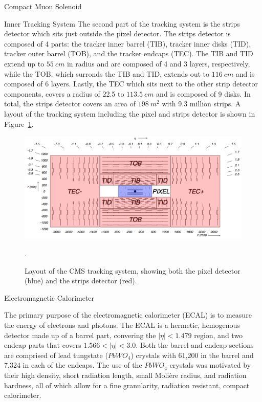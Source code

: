 \begin{section}{Compact Muon Solenoid}
\begin{subsection}{Inner Tracking System}
The second part of the tracking system is the strips detector which sits just outside the pixel detector.
The strips detector is composed of 4 parts: the tracker inner barrel (TIB), tracker inner disks (TID), tracker outer barrel (TOB), and the tracker endcaps (TEC).
The TIB and TID extend up to $55~cm$ in radius and are composed of 4 and 3 layers, respectively, while the TOB, which surronds the TIB and TID, extends out to $116~cm$ and is composed of 6 layers.
Lastly, the TEC which sits next to the other strip detector components, covers a radius of 22.5 to $113.5~cm$ and is composed of 9 disks.
In total, the strips detector covers an area of $198~m^{2}$ with 9.3 million strips.
A layout of the tracking system including the pixel and strips detector is shown in Figure~\ref{fig:cms_tracker}.

\begin{figure}[tbp!]
\begin{center}
\includegraphics[angle=0,width=0.80\columnwidth]{fig/cms_tracker.png}
\end{center}
\caption{Layout of the CMS tracking system, showing both the pixel detector (blue) and the strips detector (red).}.
\label{fig:cms_tracker}
\end{figure}

\end{subsection}

\begin{subsection}{Electromagnetic Calorimeter}

The primary purpose of the electromagnetic calorimeter (ECAL) is to measure the energy of electrons and photons.
The ECAL is a hermetic, hemogenous detector made up of a barrel part, convering the $|\eta|<1.479$ region, and two endcap parts that covers $1.566<|\eta|<3.0$.
Both the barrel and endcap sections are comprised of lead tungstate ($PbWO_{4}$) crystals with 61,200 in the barrel and 7,324 in each of the endcaps.
The use of the $PbWO_{4}$ crystals was motivated by their high density, short radiation length, small Moli\`ere radius, and radiation hardness, all of which allow for a fine granularity, radiation resistant, compact calorimeter.


\end{subsection}
\end{section}
